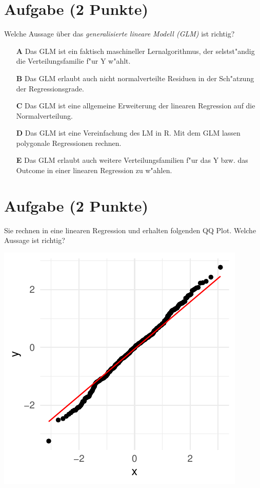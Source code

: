 \documentclass[a4paper, 9pt]{scrartcl}\usepackage[]{graphicx}\usepackage[]{xcolor}
\makeatletter
\def\maxwidth{ %
  \ifdim\Gin@nat@width>\linewidth
    \linewidth
  \else
    \Gin@nat@width
  \fi
}
\makeatother
\begin{document}
\section{Aufgabe \hfill (2 Punkte)}

Welche Aussage {\"u}ber das \textit{generalisierte lineare Modell (GLM)} ist richtig?  



\begin{enumerate}
\item [\textbf{A} \msquare] Das GLM ist ein faktisch maschineller Lernalgorithmus, der selstst{"a}ndig die Verteilungsfamilie f{"u}r Y w{"a}hlt.
\item [\textbf{B} \msquare] Das GLM erlaubt auch nicht normalverteilte Residuen in der Sch{"a}tzung der Regressionsgrade.
\item [\textbf{C} \msquare] Das GLM ist eine allgemeine Erweiterung der linearen Regression auf die Normalverteilung.
\item [\textbf{D} \msquare] Das GLM ist eine Vereinfachung des LM in R. Mit dem GLM lassen polygonale Regressionen rechnen.
\item [\textbf{E} \msquare] Das GLM erlaubt auch weitere Verteilungsfamilien f{"u}r das Y bzw. das Outcome in einer linearen Regression zu w{"a}hlen.
\end{enumerate}

\section{Aufgabe \hfill (2 Punkte)}

Sie rechnen in eine linearen Regression und erhalten folgenden QQ
Plot. Welche Aussage ist richtig?




{\centering \includegraphics[width=\maxwidth]{img/mc-regression-05-a-1} 

}
\end{document}

